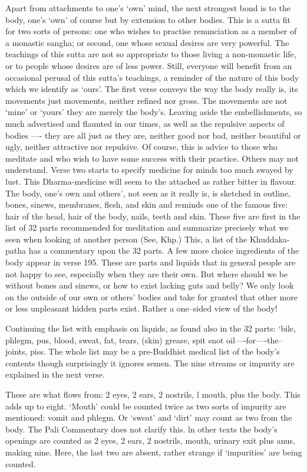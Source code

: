 Apart from attachments to one's `own' mind, the next strongest bond is to the body, one's `own' of course but by extension to other bodies. This is a sutta ﬁt for two sorts of persons: one who wishes to practise renunciation as a member of a monastic sangha; or second, one whose sexual desires are very powerful. The teachings of this sutta are not so appropriate to  those living a non-monastic life, or to people whose desires are of less power. Still, everyone will beneﬁt from an occasional perusal of this sutta's teachings, a reminder of the nature of this body which we identify as `ours'. The ﬁrst verse conveys the way the body really is, its movements just movements, neither reﬁned nor gross. The movements are not `mine' or `yours' they are merely the body's. Leaving aside the embellishments, so much advertised and flaunted in our times, as well as the repulsive aspects of bodies —-   they are all just as they are, neither good nor bad, neither beautiful or ugly, neither attractive nor repulsive. Of course, this is advice to those who meditate and who wish to have some success with their practice. Others may not understand. Verse two starts to specify medicine for minds too much swayed by lust. This Dharma-medicine will seem to the attached as rather bitter in ﬂavour. The body, one's own and others', not seen as it really is, is sketched in outline, bones, sinews, membranes, ﬂesh, and skin and reminds one of the famous ﬁve: hair of the head, hair of the body, nails, teeth and skin. These ﬁve are ﬁrst in the list of 32 parts recommended for meditation and summarize precisely what we seen when looking at another person (See, Khp.) This, a list of the Khuddaka-patha has a commentary upon the 32 parts. A few more choice ingredients of the body appear in verse 195. These are parts and liquids that in general people are not happy to see, especially when they are their own. But where should we be without bones and sinews, or how to exist lacking guts and belly? We only look on the outside of our own or others' bodies and take for granted that other more or less unpleasant hidden parts exist. Rather a one--sided view of the body!

Continuing the list with emphasis on liquids, as found also in the 32 parts: `bile, phlegm, pus, blood, sweat, fat, tears, (skin) grease, spit snot oil—-for—-the--joints, piss. The whole list may be a pre-Buddhist medical list of the body's contents though surprisingly it ignores semen. The nine streams or impurity are explained in the next verse. 

These are what flows from: 2 eyes, 2 ears, 2 nostrils, l mouth, plus the body. This adds up to eight. `Mouth' could be counted twice as two sorts of impurity are mentioned: vomit and phlegm. Or `sweat' and `dirt' may count as   two from the body. The Pali Commentary does not clarify this. ln other texts the body's openings are counted as 2 eyes, 2 ears, 2 nostrils, mouth, urinary exit  plus anus, making nine. Here, the last two are absent, rather strange if `impurities' are being counted.

